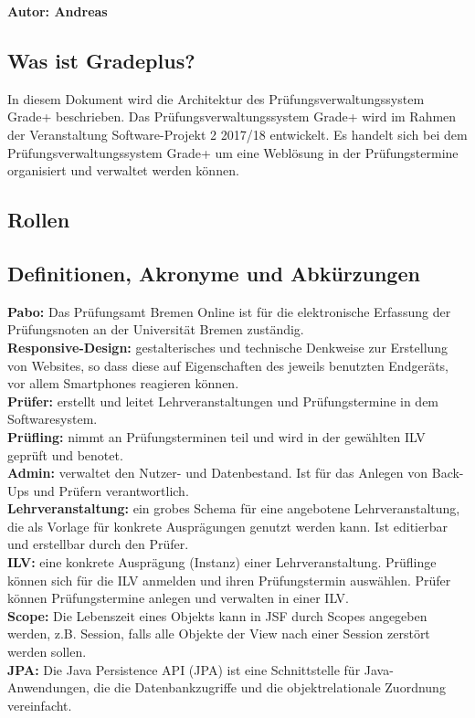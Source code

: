 \textbf{Autor: Andreas}\\
\subsection{Was ist Gradeplus?} %

{  In diesem Dokument wird die Architektur des Prüfungsverwaltungssystem \glqq{}Grade+\grqq{} 
beschrieben. Das Prüfungsverwaltungssystem \glqq{}Grade+\grqq{}  wird im Rahmen der Veranstaltung Software-Projekt 2 2017/18 entwickelt. Es handelt sich bei dem Prüfungsverwaltungssystem \glqq{}Grade+\grqq{}  um eine Weblösung in der Prüfungstermine organisiert und verwaltet werden können.  \\
}

\subsection{Rollen}
%

\subsection{Definitionen, Akronyme und Abkürzungen}
{ 
\textbf{Pabo:}  Das Prüfungsamt Bremen Online ist für die elektronische Erfassung der Prüfungsnoten an der Universität Bremen zuständig.\\
\textbf{Responsive-Design:}  gestalterisches und technische Denkweise zur Erstellung von Websites, so dass diese auf Eigenschaften des jeweils benutzten Endgeräts, vor allem Smartphones reagieren können.\\
\textbf{Prüfer:} erstellt und leitet Lehrveranstaltungen und Prüfungstermine in dem Softwaresystem. \\ 
\textbf{Prüfling:} nimmt an Prüfungsterminen teil und wird in der gewählten ILV geprüft und benotet. \\ 
\textbf{Admin:} verwaltet den Nutzer- und Datenbestand. Ist für das Anlegen von Back-Ups und Prüfern verantwortlich. \\
\textbf{Lehrveranstaltung:} ein grobes Schema für eine angebotene Lehrveranstaltung, die als Vorlage für konkrete Ausprägungen genutzt werden kann. Ist editierbar und erstellbar durch den Prüfer. \\
\textbf{ILV:} eine konkrete Ausprägung (Instanz) einer Lehrveranstaltung. Prüflinge können sich für die ILV anmelden und ihren Prüfungstermin auswählen. Prüfer können Prüfungstermine anlegen und verwalten in einer ILV. \\
\textbf{Scope:} Die Lebenszeit eines Objekts kann in JSF durch Scopes angegeben werden, z.B. Session, falls alle Objekte der View nach einer Session zerstört werden sollen.\\
\textbf{JPA:} Die Java Persistence API (JPA) ist eine Schnittstelle für Java-Anwendungen, die die Datenbankzugriffe und die objektrelationale Zuordnung vereinfacht.
}

